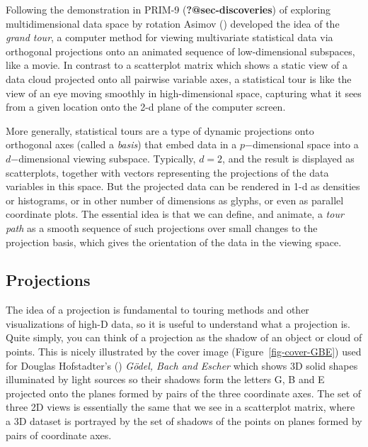 \documentclass[
  letterpaper,
  10pt,
  krantz2]{krantz}
\begin{document}
{Following the demonstration in PRIM-9 (\textbf{?@sec-discoveries}) of
exploring multidimensional data space by rotation Asimov
() developed the idea of the \emph{grand
tour}, a computer method for viewing multivariate statistical data via
orthogonal projections onto an animated sequence of low-dimensional
subspaces, like a movie. In contrast to a scatterplot matrix which shows
a static view of a data cloud projected onto all pairwise variable axes,
a statistical tour is like the view of an eye moving smoothly in
high-dimensional space, capturing what it sees from a given location
onto the 2-d plane of the computer screen.

More generally, statistical tours are a type of dynamic projections onto
orthogonal axes (called a \emph{basis}) that embed data in a
\(p\)−dimensional space into a \(d\)−dimensional viewing subspace.
Typically, \(d=2\), and the result is displayed as scatterplots,
together with vectors representing the projections of the data variables
in this space. But the projected data can be rendered in 1-d as
densities or histograms, or in other number of dimensions as glyphs, or
even as parallel coordinate plots. The essential idea is that we can
define, and animate, a \emph{tour path} as a smooth sequence of such
projections over small changes to the projection basis, which gives the
orientation of the data in the viewing space.

\subsection{Projections}\label{projections}

The idea of a projection is fundamental to touring methods and other
visualizations of high-D data, so it is useful to understand what a
projection is. Quite simply, you can think of a projection as the shadow
of an object or cloud of points. This is nicely illustrated by the cover
image (Figure~\ref{fig-cover-GBE}) used for Douglas Hofstadter's
() \emph{Gödel, Bach and Escher}
which shows 3D solid shapes illuminated by light sources so their
shadows form the letters G, B and E projected onto the planes formed by
pairs of the three coordinate axes. The set of three 2D views is
essentially the same that we see in a scatterplot matrix, where a 3D
dataset is portrayed by the set of shadows of the points on planes
formed by pairs of coordinate axes.

\begin{figure}


\end{figure}}
\end{document}
